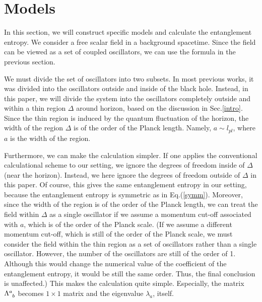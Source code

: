 \section{Models}
\label{model}
In this section, we will construct specific models and
calculate the entanglement entropy.
We consider a free scalar field in a background spacetime.
Since the field can be viewed as a set of coupled oscillators,
we can use the formula in the previous section.

We must divide the set of oscillators into two subsets.
In most previous works,
it was divided into the oscillators outside and
inside of the black hole.
Instead, in this paper, we will divide the system into 
the oscillators completely outside and
within a thin region $\Delta$ around horizon,
based on the discussion in Sec.\ref{intro}.
Since the thin region
is induced by the quantum fluctuation of the horizon,
the width of the region $\Delta$ is of the order of
the Planck length.
Namely, $a\sim l_{pl}$, where $a$ is the width of the region.

Furthermore, we can make the calculation simpler.
If one applies the conventional calculational scheme
to our setting, we ignore the degrees of freedom
inside of $\Delta$ (near the horizon).
Instead, we here ignore the degrees of freedom
outside of $\Delta$ in this paper.
Of course, this gives the same entanglement entropy
in our setting, because the entanglement entropy is
symmetric as in Eq.(\ref{symm}).
Moreover,
since the width of the region is of the order of
the Planck length,
we can treat the field within $\Delta$ as
a single oscillator
if we assume a momentum cut-off associated with $a$,
which is of the order of the Planck scale.
(If we assume a different momentum cut-off, which is still
of the order of the Planck scale,
we must consider the field within the thin region as
a set of oscillators rather than a single oscillator.
However,
the number of the oscillators are still of the order of 1.
Although this would change the numerical value
of the coefficient of the entanglement entropy,
it would be still the same order.
Thus, the final conclusion is unaffected.)
This makes the calculation quite simple.
Especially, the matrix $\Lambda^a_{\sp b}$ becomes
$1\times1$ matrix and the eigenvalue $\lambda_a$, itself.

